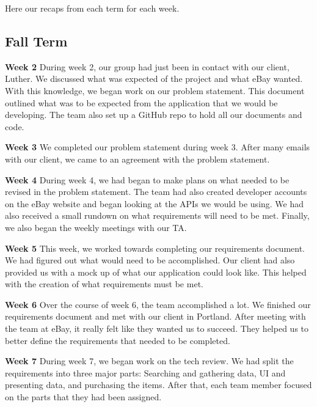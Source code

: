 \documentclass[journal,compsoc, 10pt, draftclsnofoot, onecolumn]{IEEEtran}
\begin{document}
Here our recaps from each term for each week.

\subsection{Fall Term}
\textbf{Week 2}\newline
During week 2, our group had just been in contact with our client, Luther. We 
discussed what was expected of the project and what eBay wanted. With this 
knowledge, we began work on our problem statement. This document outlined 
what was to be expected from the application that we would be developing. The 
team also set up a GitHub repo to hold all our documents and code. \newline

\textbf{Week 3}\newline
We completed our problem statement during week 3. After many emails with our 
client, we came to an agreement with the problem statement.  \newline

\textbf{Week 4}\newline
During week 4, we had began to make plans on what needed to be revised in the 
problem statement. The team had also created developer accounts on the eBay 
website and began looking at the APIs we would be using. We had also received 
a small rundown on what requirements will need to be met. Finally, we also began 
the weekly meetings with our TA.\newline

\textbf{Week 5}\newline
This week, we worked towards completing our requirements document. We had 
figured out what would need to be accomplished. Our client had also provided us 
with a mock up of what our application could look like. This helped with the 
creation of what requirements must be met.\newline

\textbf{Week 6}\newline
Over the course of week 6, the team accomplished a lot. We finished our 
requirements document and met with our client in Portland. After meeting with 
the team at eBay, it really felt like they wanted us to succeed. They helped us 
to better define the requirements that needed to be completed.\newline

\textbf{Week 7}\newline
During week 7, we began work on the tech review. We had split the requirements 
into three major parts: Searching and gathering data, UI and presenting data, and 
purchasing the items. After that, each team member focused on the parts that they 
had been assigned. \newline
\end{document}
